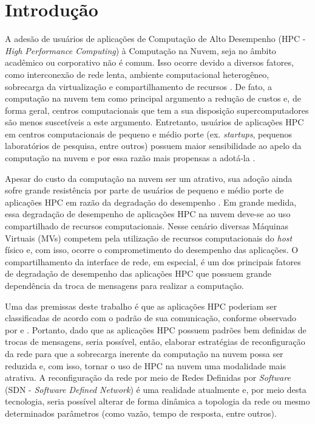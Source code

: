 \documentclass[10pt, conference, compsocconf]{IEEEtran}
\begin{document}
\section{Introdução}
A adesão de usuários de aplicações de Computação de Alto Desempenho (HPC - \textit{High Performance Computing}) à Computação na Nuvem, seja no âmbito acadêmico ou corporativo não é comum. Isso ocorre devido a diversos fatores, como interconexão de rede lenta, ambiente computacional heterogêneo, sobrecarga da virtualização e compartilhamento de recursos \cite{Gupta:2014}. De fato, a computação na nuvem tem como principal argumento a redução de custos e, de forma geral, centros computacionais que tem a sua disposição supercomputadores são menos suscetíveis a este argumento. Entretanto, usuários de aplicações HPC em centros computacionais de pequeno e médio porte (ex. \textit{startups}, pequenos laboratórios de pesquisa, entre outros) possuem maior sensibilidade ao apelo da computação na nuvem e por essa razão mais propensas a adotá-la \cite{Gupta:2014} \cite{Gupta:2013}.

Apesar do custo da computação na nuvem ser um atrativo, sua adoção ainda sofre grande resistência por parte de usuários de pequeno e médio porte de aplicações HPC em razão da degradação do desempenho \cite{Niu:2013}. Em grande medida, essa degradação de desempenho de aplicações HPC na nuvem deve-se ao uso compartilhado de recursos computacionais. Nesse cenário diversas Máquinas Virtuais (MVs) competem pela utilização de recursos computacionais do \textit{host} físico e, com isso, ocorre o comprometimento do desempenho das aplicações. O compartilhamento da interface de rede, em especial, é um dos principais fatores de degradação de desempenho \cite{Gupta:2014} das aplicações HPC que possuem grande dependência da troca de mensagens para realizar a computação.

Uma das premissas deste trabalho é que as aplicações HPC poderiam ser classificadas de acordo com o padrão de sua comunicação, conforme observado por \citet{Gupta:2014} e \citet{Asanovic:2006}. Portanto, dado que as aplicações HPC possuem padrões bem definidas de trocas de mensagens, seria possível, então, elaborar estratégias de reconfiguração da rede para que a sobrecarga inerente da computação na nuvem possa ser reduzida e, com isso, tornar o uso de HPC na nuvem uma modalidade mais atrativa. A reconfiguração da rede por meio de Redes Definidas por \textit{Software} (SDN - \textit {Software Defined Network}) \cite{fundation2012software} é uma realidade atualmente e, por meio desta tecnologia, seria possível alterar de forma dinâmica a topologia da rede ou mesmo determinados parâmetros (como vazão, tempo de resposta, entre outros).
\end{document}
